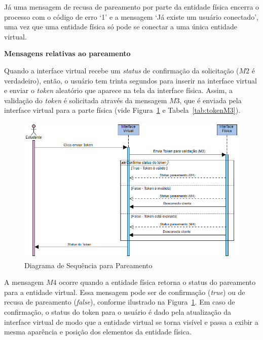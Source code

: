Já uma mensagem de recusa de pareamento por parte da entidade física encerra o processo com o código de erro `1' e a mensagem `Já existe um usuário conectado', uma vez que uma entidade física só pode se conectar a uma única entidade virtual.

\textbf{Mensagens relativas ao pareamento}

Quando a interface virtual recebe um \textit{status} de confirmação da solicitação ($M2$ é verdadeiro), então, o usuário tem trinta segundos para inserir na interface virtual e enviar o \textit{token} aleatório que aparece na tela da interface física. Assim, a validação do \textit{token} é solicitada através da mensagem $M3$, que é enviada pela interface virtual para a parte física (vide Figura~\ref{fig:diagrama-token} e Tabela~\ref{tab:tokenM3}).

\begin{figure}[htb]
	\centering
	\includegraphics[width=0.9\linewidth]{chapters/proposedMethod/msg_token.png}
	\caption{Diagrama de Sequência para Pareamento}
	\label{fig:diagrama-token}
\end{figure}

A mensagem $M4$ ocorre quando a entidade física retorna o status do pareamento para a entidade virtual. Essa mensagem pode ser de confirmação (\textit{true}) ou de recusa de pareamento (\textit{false}), conforme ilustrado na Figura~\ref{fig:diagrama-token}. Em caso de confirmação, o status do token para o usuário é dado pela atualização da interface virtual de modo que a entidade virtual se torna visível e passa a exibir a mesma aparência e posição dos elementos da entidade física.

